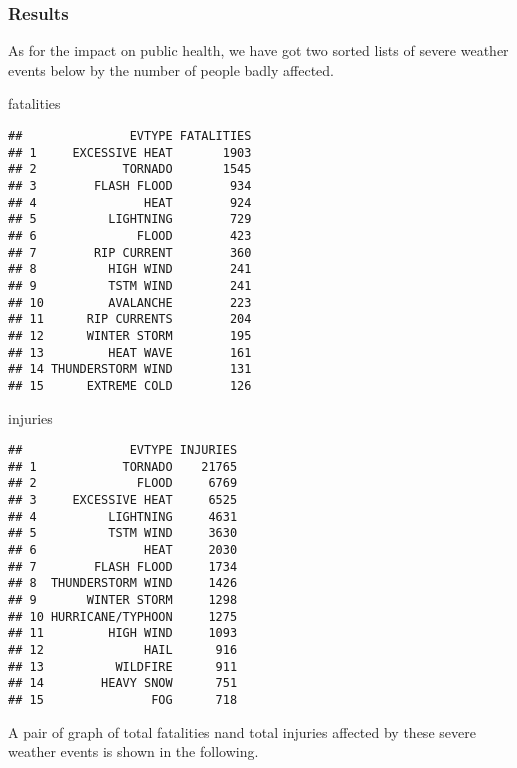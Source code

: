 \documentclass[]{article}
\newenvironment{Shaded}{\begin{snugshade}}{\end{snugshade}}
\newcommand{\NormalTok}[1]{#1}
\begin{document}
\subsubsection{Results}\label{results}

As for the impact on public health, we have got two sorted lists of
severe weather events below by the number of people badly affected.

\begin{Shaded}
\begin{Highlighting}[]
\NormalTok{fatalities}
\end{Highlighting}
\end{Shaded}

\begin{verbatim}
##               EVTYPE FATALITIES
## 1     EXCESSIVE HEAT       1903
## 2            TORNADO       1545
## 3        FLASH FLOOD        934
## 4               HEAT        924
## 5          LIGHTNING        729
## 6              FLOOD        423
## 7        RIP CURRENT        360
## 8          HIGH WIND        241
## 9          TSTM WIND        241
## 10         AVALANCHE        223
## 11      RIP CURRENTS        204
## 12      WINTER STORM        195
## 13         HEAT WAVE        161
## 14 THUNDERSTORM WIND        131
## 15      EXTREME COLD        126
\end{verbatim}

\begin{Shaded}
\begin{Highlighting}[]
\NormalTok{injuries}
\end{Highlighting}
\end{Shaded}

\begin{verbatim}
##               EVTYPE INJURIES
## 1            TORNADO    21765
## 2              FLOOD     6769
## 3     EXCESSIVE HEAT     6525
## 4          LIGHTNING     4631
## 5          TSTM WIND     3630
## 6               HEAT     2030
## 7        FLASH FLOOD     1734
## 8  THUNDERSTORM WIND     1426
## 9       WINTER STORM     1298
## 10 HURRICANE/TYPHOON     1275
## 11         HIGH WIND     1093
## 12              HAIL      916
## 13          WILDFIRE      911
## 14        HEAVY SNOW      751
## 15               FOG      718
\end{verbatim}

A pair of graph of total fatalities nand total injuries affected by
these severe weather events is shown in the following.
\end{document}
